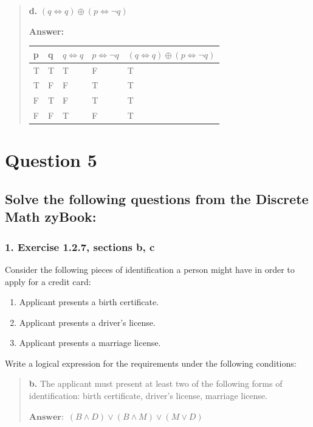 \documentclass[11pt, oneside]{article}
\begin{document}
\begin{quote}
\textbf{d. }$(q \iff q) \oplus (p \iff \neg q)$

\textbf{Answer:}

\begin{tabular}{ |p{0.5cm}|p{0.5cm}|p{2cm}|p{2cm}|p{5cm}|  }
    \hline
    p & q & $q \iff q$ & $p \iff \neg q$ & $(q \iff q) \oplus (p \iff \neg q)$ \\
    \hline
    T & T & T & F & T \\
    T & F & F & T & T \\
    F & T & F & T & T \\
    F & F & T & F & T \\
    \hline
\end{tabular}
\end{quote}

\pagebreak

\section*{Question 5}

\subsection*{Solve the following questions from the Discrete Math zyBook:}

\subsubsection*{1. Exercise 1.2.7, sections b, c}

Consider the following pieces of identification a person might have in order to apply for a credit card:

\begin{enumerate}
    \item[B:] Applicant presents a birth certificate.
    \item[D:] Applicant presents a driver's license.
    \item[M:] Applicant presents a marriage license.
\end{enumerate}

Write a logical expression for the requirements under the following conditions:

\begin{quote}
    \textbf{b. }The applicant must present at least two of the following forms of identification: birth certificate, driver's license, marriage license.

    \(\textbf{Answer:}\enspace(B \land D) \lor (B \land M) \lor (M \lor D)\)
\end{quote}
\end{document}
